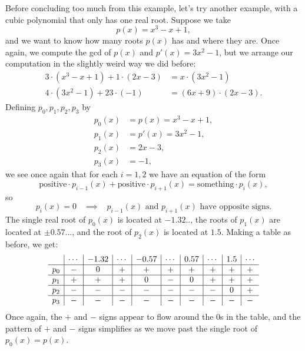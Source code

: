 Before concluding too much from this example, let's try another example, with a cubic polynomial that only has one real root. Suppose we take
\[
p(x) = x^3 - x + 1,
\]
and we want to know how many roots $p(x)$ has and where they are. Once again, we compute the gcd of $p(x)$ and $p'(x) = 3x^2 - 1$, but we arrange our computation in the slightly weird way we did before:
\begin{align*}
3\cdot(x^3 - x + 1) + 1\cdot(2x-3) &= x\cdot(3x^2 - 1)\\
4\cdot(3x^2-1) + 23\cdot (-1) &= (6x+9)\cdot(2x-3).
\end{align*}
Defining $p_0, p_1, p_2, p_3$ by
\begin{align*}
p_0(x) &= p(x) = x^3 - x + 1,\\
p_1(x) &= p'(x) = 3x^2 - 1,\\
p_2(x) &= 2x - 3,\\
p_3(x) &= -1,
\end{align*}
we see once again that for each $i = 1,2$ we have an equation of the form
\[
\text{positive}\cdot p_{i-1}(x) + \text{positive}\cdot p_{i+1}(x) = \text{something}\cdot p_i(x),
\]
so
\[
p_i(x) = 0 \;\;\; \implies \;\;\; p_{i-1}(x) \text{ and } p_{i+1}(x) \text{ have opposite signs.}
\]
The single real root of $p_0(x)$ is located at $-1.32..$, the roots of $p_1(x)$ are located at $\pm 0.57...$, and the root of $p_2(x)$ is located at $1.5$. Making a table as before, we get:
\[
\begin{array}{c | c | c | c | c | c | c | c | c | c}
& \cdots & -1.32 & \cdots & -0.57 & \cdots & 0.57 & \cdots & 1.5 & \cdots\\
\hline
p_0 & - & 0 & + & + & + & + & + & + & +\\
\hline
p_1 & + & + & + & 0 & - & 0 & + & + & +\\
\hline
p_2 & - & - & - & - & - & - & - & 0 & +\\
\hline
p_3 & - & - & - & - & - & - & - & - & -
\end{array}
\]
Once again, the $+$ and $-$ signs appear to flow around the $0$s in the table, and the pattern of $+$ and $-$ signs simplifies as we move past the single root of $p_0(x) = p(x)$.


